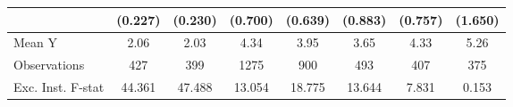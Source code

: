 {\begin{tabular}{l*{7}{c}}
            &     (0.227)         &     (0.230)         &     (0.700)         &     (0.639)         &     (0.883)         &     (0.757)         &     (1.650)         \\
\midrule
Mean Y      &        2.06         &        2.03         &        4.34         &        3.95         &        3.65         &        4.33         &        5.26         \\
Observations&         427         &         399         &        1275         &         900         &         493         &         407         &         375         \\
Exc. Inst. F-stat&      44.361         &      47.488         &      13.054         &      18.775         &      13.644         &       7.831         &       0.153         \\
\bottomrule
\end{tabular}
}
